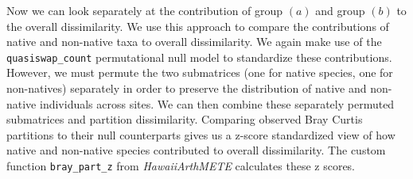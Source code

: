 \documentclass[
  letterpaper,
  DIV=11,
  numbers=noendperiod]{scrartcl}
\begin{document}
Now we can look separately at the contribution of group \((a)\) and
group \((b)\) to the overall dissimilarity. We use this approach to
compare the contributions of native and non-native taxa to overall
dissimilarity. We again make use of the \texttt{quasiswap\_count}
permutational null model to standardize these contributions. However, we
must permute the two submatrices (one for native species, one for
non-natives) separately in order to preserve the distribution of native
and non-native individuals across sites. We can then combine these
separately permuted submatrices and partition dissimilarity. Comparing
observed Bray Curtis partitions to their null counterparts gives us a
z-score standardized view of how native and non-native species
contributed to overall dissimilarity. The custom function
\texttt{bray\_part\_z} from \emph{HawaiiArthMETE} calculates these z
scores.
\end{document}

